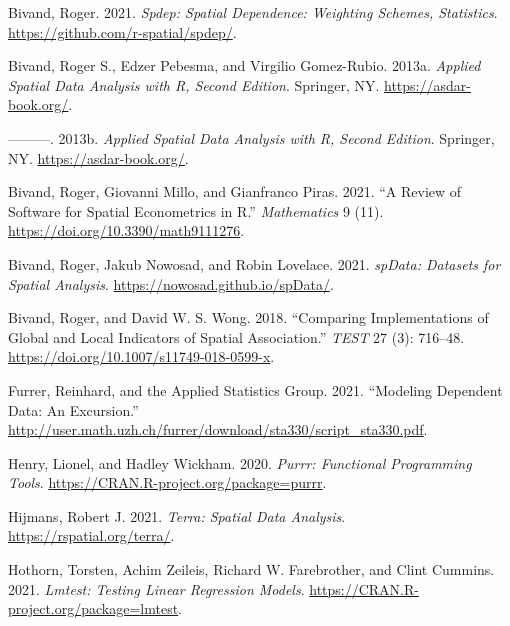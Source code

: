 \documentclass[
]{article}
\newlength{\cslhangindent}
\newlength{\cslentryspacingunit} %
\newenvironment{CSLReferences}[2] %
 {%
  \setlength{\parindent}{0pt}
  \ifodd #1
  \let\oldpar\par
  \def\par{\hangindent=\cslhangindent\oldpar}
  \fi
  \setlength{\parskip}{#2\cslentryspacingunit}
 }%
 {}
\begin{document}
\hypertarget{refs}{}
\begin{CSLReferences}{1}{0}
\leavevmode{}%
Bivand, Roger. 2021. \emph{Spdep: Spatial Dependence: Weighting Schemes,
Statistics}. \url{https://github.com/r-spatial/spdep/}.

\leavevmode{}%
Bivand, Roger S., Edzer Pebesma, and Virgilio Gomez-Rubio. 2013a.
\emph{Applied Spatial Data Analysis with {R}, Second Edition}. Springer,
NY. \url{https://asdar-book.org/}.

\leavevmode{}%
---------. 2013b. \emph{Applied Spatial Data Analysis with {R}, Second
Edition}. Springer, NY. \url{https://asdar-book.org/}.

\leavevmode{}%
Bivand, Roger, Giovanni Millo, and Gianfranco Piras. 2021. {``A Review
of Software for Spatial Econometrics in {R}.''} \emph{Mathematics} 9
(11). \url{https://doi.org/10.3390/math9111276}.

\leavevmode{}%
Bivand, Roger, Jakub Nowosad, and Robin Lovelace. 2021. \emph{spData:
Datasets for Spatial Analysis}. \url{https://nowosad.github.io/spData/}.

\leavevmode{}%
Bivand, Roger, and David W. S. Wong. 2018. {``Comparing Implementations
of Global and Local Indicators of Spatial Association.''} \emph{TEST} 27
(3): 716--48. \url{https://doi.org/10.1007/s11749-018-0599-x}.

\leavevmode{}%
Furrer, Reinhard, and the Applied Statistics Group. 2021. {``Modeling
Dependent Data: An Excursion.''}
\url{http://user.math.uzh.ch/furrer/download/sta330/script_sta330.pdf}.

\leavevmode{}%
Henry, Lionel, and Hadley Wickham. 2020. \emph{Purrr: Functional
Programming Tools}. \url{https://CRAN.R-project.org/package=purrr}.

\leavevmode{}%
Hijmans, Robert J. 2021. \emph{Terra: Spatial Data Analysis}.
\url{https://rspatial.org/terra/}.

\leavevmode{}%
Hothorn, Torsten, Achim Zeileis, Richard W. Farebrother, and Clint
Cummins. 2021. \emph{Lmtest: Testing Linear Regression Models}.
\url{https://CRAN.R-project.org/package=lmtest}.


\end{CSLReferences}
\end{document}

